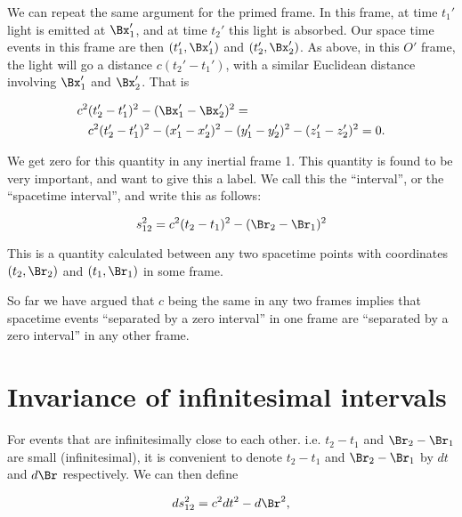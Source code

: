 We can repeat the same argument for the primed frame.  In this frame, at time \(t_1'\) light is emitted at \(\Bx_1'\), and at time \(t_2'\) this light is absorbed.  Our space time events in this frame are then \((t_1', \Bx_1')\) and \((t_2', \Bx_2')\).  As above, in this \(O'\) frame, the light will go a distance \(c(t_2' - t_1')\), with a similar Euclidean distance involving \(\Bx_1'\) and \(\Bx_2'\).  That is

\begin{equation}\label{eqn:relativisticElectrodynamicsL2:40}
\begin{aligned}
c^2 &(t_2' - t_1')^2 - (\Bx_1' - \Bx_2')^2 = \\
&c^2 (t_2' - t_1')^2 
- (x_1' - x_2')^2
- (y_1' - y_2')^2
- (z_1' - z_2')^2 = 0.
\end{aligned}
\end{equation}

We get zero for this quantity in any inertial frame 1.  This quantity is found to be very important, and want to give this a label.  We call this the ``interval'', or the ``spacetime interval'', and write this as follows:

\begin{equation}\label{eqn:relativisticElectrodynamicsL2:50}
s_{12}^2 = c^2 (t_2 - t_1)^2 - (\Br_2 - \Br_1)^2
\end{equation}

This is a quantity calculated between any two spacetime points with coordinates \((t_2, \Br_2)\) and \((t_1, \Br_1)\) in some frame.

So far we have argued that \(c\) being the same in any two frames implies that spacetime events ``separated by a zero interval'' in one frame are ``separated by a zero interval'' in any other frame.

\section{Invariance of infinitesimal intervals}

For events that are infinitesimally close to each other.  i.e. \(t_2 - t_1\) and \(\Br_2 -\Br_1\) are small (infinitesimal), it is convenient to denote \(t_2 - t_1\) and \(\Br_2 - \Br_1\) by \(dt\) and \(d\Br\) respectively.  We can then define

\begin{equation}\label{eqn:relativisticElectrodynamicsL2:60}
ds_{12}^2 = c^2 dt^2 - d\Br^2,
\end{equation}

